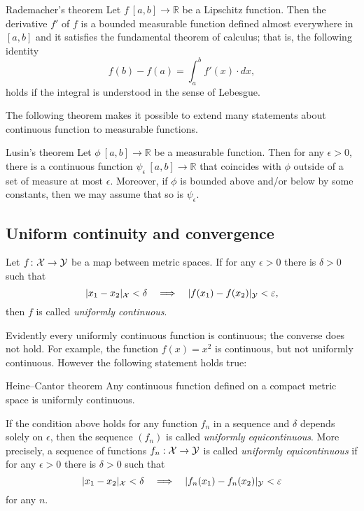 \begin{thm}{Rademacher's theorem}\label{thm:rademacher}
Let $f\:[a,b]\to\mathbb{R}$ be a Lipschitz function.
Then the derivative $f'$ of $f$ is a bounded measurable function defined almost everywhere in $[a,b]$ and it satisfies the fundamental theorem of calculus; that is, the following identity 
\[f(b)-f(a)=\int_a^b f'(x)\cdot dx,\]
holds if the integral is understood in the sense of Lebesgue.
\end{thm}

The following theorem makes it possible to extend many statements about continuous function to measurable functions.

\begin{thm}{Lusin's theorem}\label{thm:lusin}
Let $\phi\:[a,b]\to \mathbb{R}$ be a measurable function.
Then for any $\epsilon>0$, there is a continuous function $\psi_\epsilon\:[a,b]\to \mathbb{R}$ that coincides with $\phi$ outside of a set of measure at most $\epsilon$.
Moreover, if $\phi$ is bounded above and/or below by some constants, then we may assume that so is $\psi_\epsilon$.  
\end{thm}

\subsection*{Uniform continuity and convergence}

Let $f\colon{\mathcal{X}}\to \mathcal{Y}$ be a map between metric spaces.
If  for any $\epsilon>0$ there is $\delta>0$ such that 
\[\dist{x_1}{x_2}{\spc{X}}<\delta\quad\Longrightarrow\quad \dist{f(x_1)}{f(x_2)}{\spc{Y}}<\epsilon,\]
then $f$ is called \emph{uniformly continuous}.

Evidently every uniformly continuous function is continuous;
the converse does not hold.
For example, the function $f(x)=x^2$ is continuous, but not uniformly continuous.
However the following statement holds true:

\begin{thm}{Heine--Cantor theorem}
Any continuous function defined on a compact metric space is uniformly continuous.
\end{thm}

If the condition above holds for any function $f_n$ in a sequence and $\delta$ depends solely on $\epsilon$,
then the sequence $(f_n)$ is called \emph{uniformly equicontinuous}.
More precisely, 
a sequence of functions $f_n:{\mathcal{X}}\to \mathcal{Y}$ is called {}\emph{uniformly equicontinuous} if 
for any $\epsilon>0$ there is $\delta>0$ such that 
\[\dist{x_1}{x_2}{\spc{X}}<\delta\quad\Longrightarrow\quad \dist{f_n(x_1)}{f_n(x_2)}{\spc{Y}}<\epsilon\]
for any $n$.


